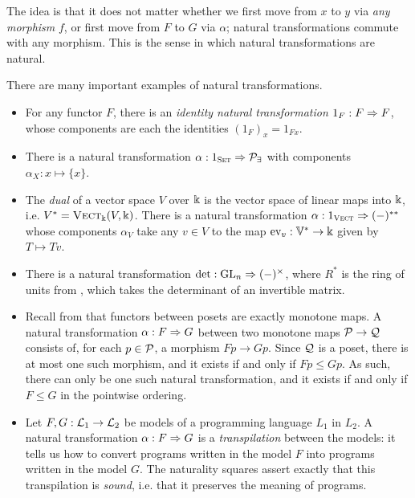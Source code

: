 The idea is that it does not matter whether we first move from $x$ to $y$ via
\emph{any morphism} $f$, or first move from $F$ to $G$ via $\alpha$; natural
transformations commute with any morphism. This is the sense in which natural
transformations are natural.

\begin{ex}
  There are many important examples of natural transformations.
  \begin{itemize}
    \item For any functor $F$, there is an \emph{identity natural transformation
      $1_F: F\Rightarrow F$}, whose components are each the identities $(1_F)_x = 1_{Fx}$.
    \item There is a natural transformation $\alpha: 1_{\textsc{\text{Set}}}\Rightarrow
      \mathcal{P}_\exists$ with components $\alpha_X: x\mapsto \{x\}$.
    \item The \emph{dual} of a vector space $V$ over $\Bbbk$ is the vector space
      of linear maps into $\Bbbk$, i.e. $V^* = {\textsc{\text{Vect}}}_\Bbbk(V, \Bbbk)$. There is
      a natural transformation $\alpha: 1_{{\textsc{\text{Vect}}}}\Rightarrow (-)^{**}$ whose
      components $\alpha_V$ take any $v\in V$ to the map $\text{ev}_v:
      \mathbb{V}^*\to\Bbbk$ given by $T\mapsto Tv$.
    \item There is a natural transformation $\det:\text{GL}_n\Rightarrow (-)^\times$, where
      $R^*$ is the ring of units from , which
      takes the determinant of an invertible matrix.
    \item Recall from  that functors between posets
      are exactly monotone maps. A natural transformation $\alpha: F\Rightarrow G$
      between two monotone maps $\mathcal{P}\to\mathcal{Q}$ consists of, for each $p\in\mathcal{P}$, a
      morphism $Fp\to Gp$. Since $\mathcal{Q}$ is a poset, there is at most one such
      morphism, and it exists if and only if $Fp\leq Gp$. As such, there can
      only be one such natural transformation, and it exists if and only if
      $F\leq G$ in the pointwise ordering.
    \item Let $F,G:\mathcal{L}_1\to\mathcal{L}_2$ be models of a programming language $L_1$ in
      $L_2$. A natural transformation $\alpha: F\Rightarrow G$ is a \emph{transpilation}
      between the models: it tells us how to convert programs written in the
      model $F$ into programs written in the model $G$. The naturality squares
      assert exactly that this transpilation is \emph{sound}, i.e. that it
      preserves the meaning of programs.
 \end{itemize}
\end{ex}

